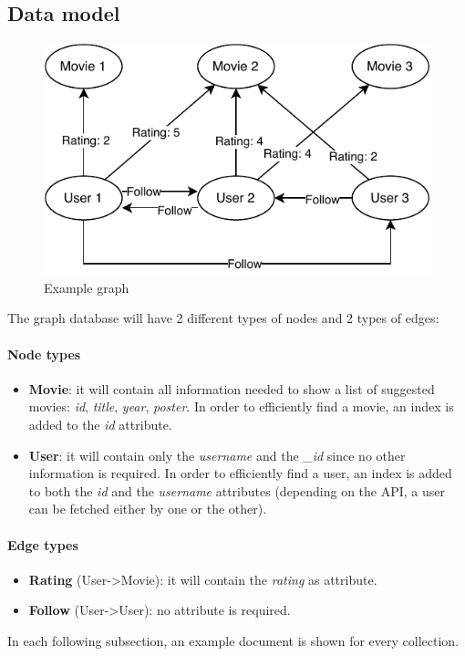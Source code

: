 \documentclass[11pt]{article}
\begin{document}
\subsection{Data model}
\begin{figure}[h!]
    \centering
    \includegraphics[width=.7\textwidth]{figs/graph_example.pdf}
    \caption{Example graph}
    \label{fig:graph_example}
\end{figure}
The graph database will have 2 different types of nodes and 2 types of edges:
\paragraph{Node types}
\begin{itemize}
	\item \textbf{Movie}: it will contain all information needed to show a list
		of suggested movies: \emph{id}, \emph{title}, \emph{year}, 
        \emph{poster}. In order to efficiently find a movie, an index is added
        to the \emph{id} attribute.
    \item \textbf{User}: it will contain only the \emph{username} and the \emph{\_id} since no other information is required. In order to efficiently find a user, an index is added to both the \emph{id} and the \emph{username}
    attributes (depending on the API, a user can be fetched either by one or 
    the other).
\end{itemize}
\paragraph{Edge types}
\begin{itemize}
	\item \textbf{Rating} (User->Movie): it will contain the \emph{rating} as 
		attribute.
	\item \textbf{Follow} (User->User): no attribute is required.
\end{itemize}
In each following subsection, an example document is shown for every collection.
\end{document}
